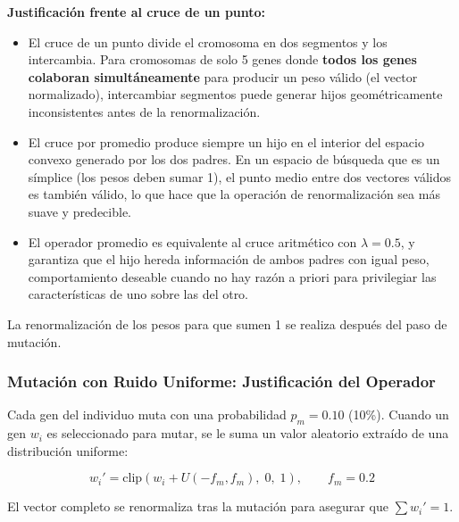 \documentclass[11pt]{article}
\begin{document}
\textbf{Justificación frente al cruce de un punto:}
\begin{itemize}
    \item El cruce de un punto divide el cromosoma en dos segmentos y los intercambia. Para cromosomas de solo 5 genes donde \textbf{todos los genes colaboran simultáneamente} para producir un peso válido (el vector normalizado), intercambiar segmentos puede generar hijos geométricamente inconsistentes antes de la renormalización.
    \item El cruce por promedio produce siempre un hijo en el interior del espacio convexo generado por los dos padres. En un espacio de búsqueda que es un símplice (los pesos deben sumar 1), el punto medio entre dos vectores válidos es también válido, lo que hace que la operación de renormalización sea más suave y predecible.
    \item El operador promedio es equivalente al cruce aritmético con $\lambda = 0.5$, y garantiza que el hijo hereda información de ambos padres con igual peso, comportamiento deseable cuando no hay razón a priori para privilegiar las características de uno sobre las del otro.
\end{itemize}

La renormalización de los pesos para que sumen 1 se realiza después del paso de mutación.

\subsubsection{Mutación con Ruido Uniforme: Justificación del Operador}

Cada gen del individuo muta con una probabilidad $p_m = 0.10$ (10\%). Cuando un gen $w_i$ es seleccionado para mutar, se le suma un valor aleatorio extraído de una distribución uniforme:

\begin{equation}
    w_i' = \text{clip}\!\left(w_i + U(-f_m, f_m),\; 0,\; 1\right), \qquad f_m = 0.2
\end{equation}

El vector completo se renormaliza tras la mutación para asegurar que $\sum w_i' = 1$.
\end{document}

